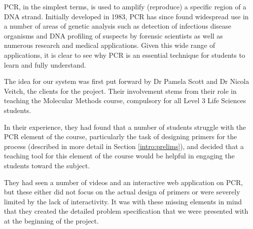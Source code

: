 
PCR, in the simplest terms, is used to amplify (reproduce) a specific region of a 
DNA strand. Initially developed in 1983, PCR has since found widespread use in a 
number of areas of genetic analysis such as detection of infectious disease 
organisms and DNA profiling of suspects by forensic scientists as well as numerous 
research and medical applications. Given this wide range of applications, it is 
clear to see why PCR is an essential technique for students to learn and fully 
understand.

The idea for our system was first put forward by Dr Pamela Scott and Dr
Nicola Veitch, the clients for the project. Their involvement stems from 
their role in teaching the Molecular Methods course, compulsory for all 
Level 3 Life Sciences students. 

In their experience, they had found that a number of students struggle with the 
PCR element of the course, particularly the task of designing primers for the 
process (described in more detail in Section \ref{intro:prelims}), and decided 
that a teaching tool for this element of the course would be helpful in engaging 
the students toward the subject. 

They had seen a number of videos and an interactive web application on PCR, but these 
either did not focus on the actual design of primers or were severely limited by the 
lack of interactivity. It was with these missing elements in mind that they created 
the detailed problem specification that we were presented with at the beginning of 
the project.
